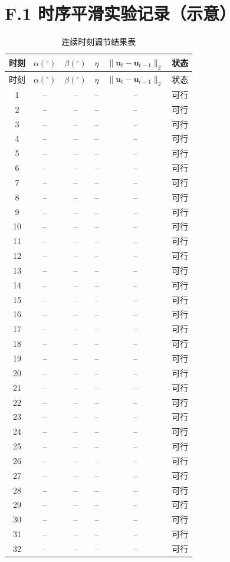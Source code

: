 \section*{F.1 时序平滑实验记录（示意）}
\small
\begin{longtable}{cccccc}
\caption{连续时刻调节结果表}\\
\toprule
时刻 & $\alpha(^\circ)$ & $\beta(^\circ)$ & $\eta$ & $\|\mathbf u_t-\mathbf u_{t-1}\|_2$ & 状态\\
\midrule
\endfirsthead
\toprule
时刻 & $\alpha(^\circ)$ & $\beta(^\circ)$ & $\eta$ & $\|\mathbf u_t-\mathbf u_{t-1}\|_2$ & 状态\\
\midrule
\endhead
1&--&--&--&--&可行\\
2&--&--&--&--&可行\\
3&--&--&--&--&可行\\
4&--&--&--&--&可行\\
5&--&--&--&--&可行\\
6&--&--&--&--&可行\\
7&--&--&--&--&可行\\
8&--&--&--&--&可行\\
9&--&--&--&--&可行\\
10&--&--&--&--&可行\\
11&--&--&--&--&可行\\
12&--&--&--&--&可行\\
13&--&--&--&--&可行\\
14&--&--&--&--&可行\\
15&--&--&--&--&可行\\
16&--&--&--&--&可行\\
17&--&--&--&--&可行\\
18&--&--&--&--&可行\\
19&--&--&--&--&可行\\
20&--&--&--&--&可行\\
21&--&--&--&--&可行\\
22&--&--&--&--&可行\\
23&--&--&--&--&可行\\
24&--&--&--&--&可行\\
25&--&--&--&--&可行\\
26&--&--&--&--&可行\\
27&--&--&--&--&可行\\
28&--&--&--&--&可行\\
29&--&--&--&--&可行\\
30&--&--&--&--&可行\\
31&--&--&--&--&可行\\
32&--&--&--&--&可行\\

\end{longtable}
